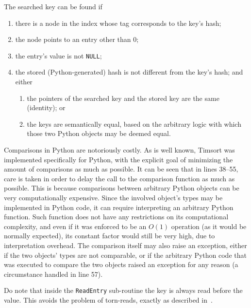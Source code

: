 The searched key can be found if
\begin{enumerate}
    \item there is a node in the index whose tag corresponds to the key's hash;
    \item the node points to an entry other than 0;
    \item the entry's value is not \texttt{NULL};
    \item the stored (Python-generated) hash is not different from the key's hash; and either
    \begin{enumerate}
        \item the pointers of the searched key and the stored key are the same (identity); or
        \item the keys are semantically equal, based on the arbitrary logic with which those two Python objects may be deemed equal.
    \end{enumerate}
\end{enumerate}

Comparisons in Python are notoriously costly.
As is well known, Timsort was implemented specifically for Python, with the explicit goal of minimizing the amount of comparisons as much as possible.
It can be seen that in lines 38--55, care is taken in order to delay the call to the comparison function as much as possible.
This is because comparisons between arbitrary Python objects can be very computationally expensive.
Since the involved object's types may be implemented in Python code, it can require interpreting an arbitrary Python function.
Such function does not have any restrictions on its computational complexity, and even if it was enforced to be an $O(1)$ operation (as it would be normally expected), its constant factor would still be very high, due to interpretation overhead.
The comparison itself may also raise an exception, either if the two objects' types are not comparable, or if the arbitrary Python code that was executed to compare the two objects raised an exception for any reason (a circumstance handled in line 57).

Do note that inside the \texttt{ReadEntry} sub-routine the key is always read before the value.
This avoids the problem of torn-reads, exactly as described in~\cite[\S4, Lookup]{maier}.

